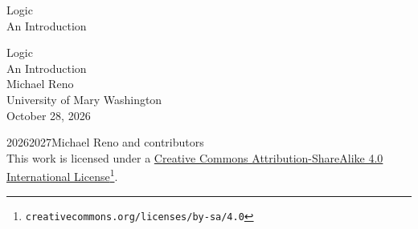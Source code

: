 \documentclass[oneside,10pt,]{book}
\newcommand{\titlepagefont}{\relax}
\begin{document}
\raggedbottom
\frontmatter
\thispagestyle{empty}
{\titlepagefont\centering
\vspace*{0.28\textheight}
{\Huge Logic}\\[2\baselineskip]
{\LARGE An Introduction}\\
}
\clearpage
\thispagestyle{empty}
{\titlepagefont\centering
\vspace*{0.14\textheight}
{\Huge Logic}\\[\baselineskip]
{\LARGE An Introduction}\\[3\baselineskip]
{\Large Michael Reno}\\[0.5\baselineskip]
{\Large University of Mary Washington}\\[3\baselineskip]
{\Large October 28, 2026}\\}
\clearpage
\thispagestyle{empty}
\hypertarget{front-colophon}{}
\noindent\textcopyright{}2026\textendash{}2027\quad{}Michael Reno and contributors\\[0.5\baselineskip]
This work is licensed under a \href{https://creativecommons.org/licenses/by-sa/4.0/}{Creative Commons Attribution-ShareAlike 4.0 International License}\footnote{\nolinkurl{creativecommons.org/licenses/by-sa/4.0}\label{frontmatter-1-3-3-2}}.\par\medskip
{}
\null\clearpage
%
%
\typeout{************************************************}
\typeout{************************************************}
%
\end{document}
